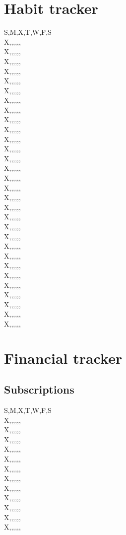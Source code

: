 \documentclass[a4paper]{article}
\begin{document}
\section{Habit tracker}
S,M,X,T,W,F,S\\
X,,,,,,\\
X,,,,,,\\
X,,,,,,\\
X,,,,,,\\
X,,,,,,\\
X,,,,,,\\
X,,,,,,\\
X,,,,,,\\
X,,,,,,\\
X,,,,,,\\
X,,,,,,\\
X,,,,,,\\
X,,,,,,\\
X,,,,,,\\
X,,,,,,\\
X,,,,,,\\
X,,,,,,\\
X,,,,,,\\
X,,,,,,\\
X,,,,,,\\
X,,,,,,\\
X,,,,,,\\
X,,,,,,\\
X,,,,,,\\
X,,,,,,\\
X,,,,,,\\
X,,,,,,\\
X,,,,,,\\
X,,,,,,\\
X,,,,,,\\
\newpage
\section{Financial tracker}
\subsection{Subscriptions}
S,M,X,T,W,F,S\\
X,,,,,,\\
X,,,,,,\\
X,,,,,,\\
X,,,,,,\\
X,,,,,,\\
X,,,,,,\\
X,,,,,,\\
X,,,,,,\\
X,,,,,,\\
X,,,,,,\\
X,,,,,,\\
X,,,,,,\\
\newpage
\end{document}
